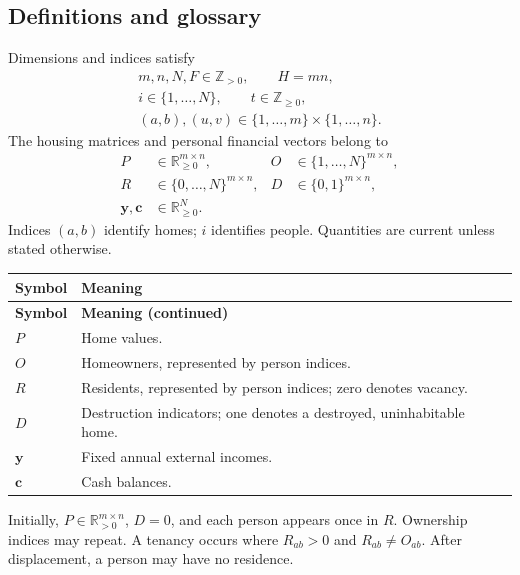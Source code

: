 \documentclass[11pt]{article}
\begin{document}
\subsection{Definitions and glossary}
Dimensions and indices satisfy
\begin{equation}
\begin{gathered}
 m,n,N,F\in\mathbb{Z}_{>0},\qquad H=mn,\\
 i\in\{1,\ldots,N\},\qquad t\in\mathbb{Z}_{\geq0},\\
 (a,b),(u,v)\in\{1,\ldots,m\}\times\{1,\ldots,n\}.
\end{gathered}
\end{equation}
The housing matrices and personal financial vectors belong to
\begin{equation}
\begin{aligned}
 P &\in \mathbb{R}_{\geq0}^{m\times n},
 & O &\in \{1,\ldots,N\}^{m\times n},\\
 R &\in \{0,\ldots,N\}^{m\times n},
 & D &\in \{0,1\}^{m\times n},\\
 \mathbf{y},\mathbf{c} &\in \mathbb{R}_{\geq0}^{N}.
\end{aligned}
\end{equation}
Indices $(a,b)$ identify homes; $i$ identifies people. Quantities are current unless stated otherwise.

\renewcommand{\arraystretch}{1.12}
\begin{longtable}{@{}p{}p{}@{}}
\toprule
\textbf{Symbol} & \textbf{Meaning} \\
\midrule
\endfirsthead
\toprule
\textbf{Symbol} & \textbf{Meaning (continued)} \\
\midrule
\endhead
\bottomrule
\endfoot
$P$ & Home values. \\
$O$ & Homeowners, represented by person indices. \\
$R$ & Residents, represented by person indices; zero denotes vacancy. \\
$D$ & Destruction indicators; one denotes a destroyed, uninhabitable home. \\
$\mathbf{y}$ & Fixed annual external incomes. \\
$\mathbf{c}$ & Cash balances. \\
\end{longtable}

Initially, $P\in\mathbb{R}_{>0}^{m\times n}$, $D=0$, and each person appears once in $R$. Ownership indices may repeat. A tenancy occurs where $R_{ab}>0$ and $R_{ab}\ne O_{ab}$. After displacement, a person may have no residence.
\end{document}
